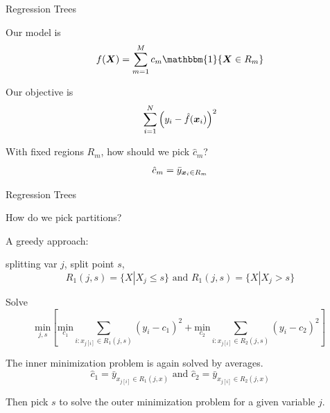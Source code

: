 \documentclass[xcolor={table}, handout]{beamer}
\begin{document}

\begin{frame}{Regression Trees}

\begin{wideitemize}
\item Our model is
\[
f(\X) = \sum_{m = 1}^M c_m \mathbbm{1}\{\X\in R_m\}
\]\pause
\item Our objective is
\[
\sum_{i = 1}^N\left(y_i - \hat{f}(\bm{x}_i)\right)^2
\]\pause
\item With fixed regions $R_m$, how should we pick $\hat c_m$?\pause
\[
\hat c_m=   \bar y_{\bm{x}_{i}\in R_m}
 \]
\end{wideitemize}


\end{frame}




\begin{frame}{Regression Trees}

\begin{wideitemize}
\item How do we pick partitions?\pause
\item A greedy approach:\pause
\begin{wideitemize}
\item splitting var $j$, split point $s$, 
\[
R_1(j,s) = \{ X|X_j \le s\} \textrm{ and } R_1(j,s) = \{ X|X_j > s\}
\]
\pause
\item Solve
\[
\underset{j,s}{\textrm{min}}\left[\underset{c_1}{\textrm{min}} \sum_{i:x_{j[i]} \in R_1(j,s)}(y_i -c_1)^2 + \underset{c_2}{\textrm{min}} \sum_{i:x_{j[i]} \in R_2(j,s)}(y_i -c_2)^2 \right]
\]\pause
\item The inner minimization problem is again solved by averages. 
\[
\hat c_1= \bar y_{x_{j[i]}\in R_1(j,x)} \textrm{ and } \hat c_2=  \bar y_{x_{j[i]}\in R_2(j,x)}
 \]\pause
 \item Then pick $s$ to solve the outer minimization problem for a given variable $j$. 
\end{wideitemize}
\end{wideitemize}


\end{frame}
\end{document}
